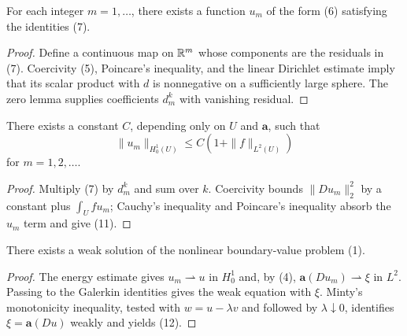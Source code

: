 \begin{theorem}
\label{thm:monotonicity-approximate-solutions}

For each integer $m = 1, \ldots$, there exists a function $u_m$ of the form (6) satisfying the identities (7).
\end{theorem}

\begin{proof}
\sketch Define a continuous map on $\mathbb{R}^m$ whose components are the residuals in (7). Coercivity (5), Poincare's inequality, and the linear Dirichlet estimate imply that its scalar product with $d$ is nonnegative on a sufficiently large sphere. The zero lemma supplies coefficients $d_m^k$ with vanishing residual.
\end{proof}

\begin{theorem}
\label{thm:monotonicity-energy-estimates}

There exists a constant $C$, depending only on $U$ and $\mathbf{a}$, such that
\[
\|u_m\|_{H^1_0(U)} \leq C(1 + \|f\|_{L^2(U)})
\tag{11}
\]
for $m = 1, 2, \ldots$.
\end{theorem}

\begin{proof}
\sketch Multiply (7) by $d_m^k$ and sum over $k$. Coercivity bounds $\|Du_m\|_2^2$ by a constant plus $\int_Ufu_m$; Cauchy's inequality and Poincare's inequality absorb the $u_m$ term and give (11).
\end{proof}

\begin{theorem}
\label{thm:monotonicity-existence-weak-solution}

There exists a weak solution of the nonlinear boundary-value problem (1).
\end{theorem}

\begin{proof}
\sketch The energy estimate gives $u_m\rightharpoonup u$ in $H_0^1$ and, by (4), $\mathbf a(Du_m)\rightharpoonup\xi$ in $L^2$. Passing to the Galerkin identities gives the weak equation with $\xi$. Minty's monotonicity inequality, tested with $w=u-\lambda v$ and followed by $\lambda\downarrow0$, identifies $\xi=\mathbf a(Du)$ weakly and yields (12).
\end{proof}

